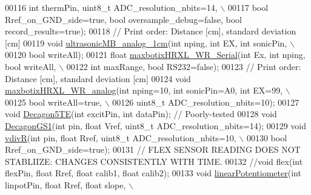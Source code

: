 \begin{DoxyCode}
00116           \textcolor{keywordtype}{int} thermPin, uint8\_t ADC\_resolution\_nbits=14, \(\backslash\)
00117           \textcolor{keywordtype}{bool} Rref\_on\_GND\_side=\textcolor{keyword}{true}, \textcolor{keywordtype}{bool} oversample\_debug=\textcolor{keyword}{false}, \textcolor{keywordtype}{bool} record\_results=\textcolor{keyword}{true});
00118     \textcolor{comment}{// Print order: Distance [cm], standard deviation [cm]}
00119     \textcolor{keywordtype}{void} \hyperlink{classLogger_a362a1462166d63ddc613eaa1e86f9854}{ultrasonicMB\_analog\_1cm}(\textcolor{keywordtype}{int} nping, \textcolor{keywordtype}{int} EX, \textcolor{keywordtype}{int} sonicPin, \(\backslash\)
00120          \textcolor{keywordtype}{bool} writeAll);
00121     \textcolor{keywordtype}{float} \hyperlink{classLogger_a87ce56cb9c3dfc7abfd6308b2ee7dc10}{maxbotixHRXL\_WR\_Serial}(\textcolor{keywordtype}{int} Ex, \textcolor{keywordtype}{int} nping, \textcolor{keywordtype}{bool} writeAll, \(\backslash\)
00122           \textcolor{keywordtype}{int} maxRange, \textcolor{keywordtype}{bool} RS232=\textcolor{keyword}{false});
00123     \textcolor{comment}{// Print order: Distance [cm], standard deviation [cm]}
00124     \textcolor{keywordtype}{void} \hyperlink{classLogger_a3ce2869bbd48fdebbf44e155981c85b0}{maxbotixHRXL\_WR\_analog}(\textcolor{keywordtype}{int} nping=10, \textcolor{keywordtype}{int} sonicPin=A0, \textcolor{keywordtype}{int} EX=99, \(\backslash\)
00125          \textcolor{keywordtype}{bool} writeAll=\textcolor{keyword}{true}, \(\backslash\)
00126          uint8\_t ADC\_resolution\_nbits=10);
00127     \textcolor{keywordtype}{void} \hyperlink{classLogger_a40ae372dee7f672a6d6f33ab441e4da1}{Decagon5TE}(\textcolor{keywordtype}{int} excitPin, \textcolor{keywordtype}{int} dataPin); \textcolor{comment}{// Poorly-tested}
00128     \textcolor{keywordtype}{void} \hyperlink{classLogger_a84da6a9ec3d4d56fdc32d950b71f1a26}{DecagonGS1}(\textcolor{keywordtype}{int} pin, \textcolor{keywordtype}{float} Vref, uint8\_t ADC\_resolution\_nbits=14);
00129     \textcolor{keywordtype}{void} \hyperlink{classLogger_ab1ae31b2bdb77c86fb6851907258171b}{vdivR}(\textcolor{keywordtype}{int} pin, \textcolor{keywordtype}{float} Rref, uint8\_t ADC\_resolution\_nbits=10, \(\backslash\)
00130          \textcolor{keywordtype}{bool} Rref\_on\_GND\_side=\textcolor{keyword}{true});
00131     \textcolor{comment}{// FLEX SENSOR READING DOES NOT STABLIIZE: CHANGES CONSISTENTLY WITH TIME.}
00132     \textcolor{comment}{//void flex(int flexPin, float Rref, float calib1, float calib2);}
00133     \textcolor{keywordtype}{void} \hyperlink{classLogger_a95670d06ec3b68300895cd7bf8c37999}{linearPotentiometer}(\textcolor{keywordtype}{int} linpotPin, \textcolor{keywordtype}{float} Rref, \textcolor{keywordtype}{float} slope, \(\backslash\)

\end{DoxyCode}
